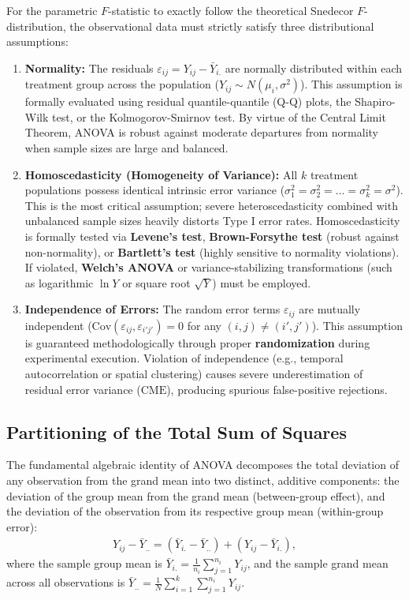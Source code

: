 For the parametric $F$-statistic to exactly follow the theoretical Snedecor $F$-distribution, the observational data must strictly satisfy three distributional assumptions:
\begin{enumerate}
	\item \textbf{Normality:} The residuals $\varepsilon_{ij} = Y_{ij} - \bar{Y}_{i.}$ are normally distributed within each treatment group across the population ($Y_{ij} \sim N(\mu_i, \sigma^2)$). This assumption is formally evaluated using residual quantile-quantile (Q-Q) plots, the Shapiro-Wilk test, or the Kolmogorov-Smirnov test. By virtue of the Central Limit Theorem, ANOVA is robust against moderate departures from normality when sample sizes are large and balanced.
	\item \textbf{Homoscedasticity (Homogeneity of Variance):} All $k$ treatment populations possess identical intrinsic error variance ($\sigma_1^2 = \sigma_2^2 = \dots = \sigma_k^2 = \sigma^2$). This is the most critical assumption; severe heteroscedasticity combined with unbalanced sample sizes heavily distorts Type I error rates. Homoscedasticity is formally tested via \textbf{Levene's test}, \textbf{Brown-Forsythe test} (robust against non-normality), or \textbf{Bartlett's test} (highly sensitive to normality violations). If violated, \textbf{Welch's ANOVA} or variance-stabilizing transformations (such as logarithmic $\ln Y$ or square root $\sqrt{Y}$) must be employed.
	\item \textbf{Independence of Errors:} The random error terms $\varepsilon_{ij}$ are mutually independent ($\text{Cov}(\varepsilon_{ij}, \varepsilon_{i'j'}) = 0$ for any $(i,j) \neq (i',j')$). This assumption is guaranteed methodologically through proper \textbf{randomization} during experimental execution. Violation of independence (e.g., temporal autocorrelation or spatial clustering) causes severe underestimation of residual error variance ($\text{CME}$), producing spurious false-positive rejections.
\end{enumerate}

\subsection{Partitioning of the Total Sum of Squares}

The fundamental algebraic identity of ANOVA decomposes the total deviation of any observation from the grand mean into two distinct, additive components: the deviation of the group mean from the grand mean (between-group effect), and the deviation of the observation from its respective group mean (within-group error):
\begin{align}
	Y_{ij} - \bar{Y}_{..} = (\bar{Y}_{i.} - \bar{Y}_{..}) + (Y_{ij} - \bar{Y}_{i.}),
\end{align}
where the sample group mean is $\bar{Y}_{i.} = \frac{1}{n_i} \sum_{j=1}^{n_i} Y_{ij}$, and the sample grand mean across all observations is $\bar{Y}_{..} = \frac{1}{N} \sum_{i=1}^k \sum_{j=1}^{n_i} Y_{ij}$.

